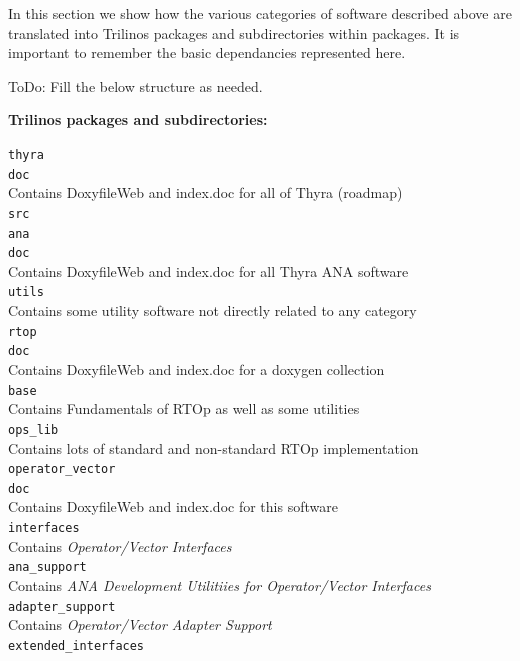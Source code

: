 \documentclass[pdf,ps2pdf,11pt]{SANDreport}
\begin{document}
In this section we show how the various categories of software described above
are translated into Trilinos packages and subdirectories within packages.  It
is important to remember the basic dependancies represented here.

ToDo: Fill the below structure as needed.

\noindent{}\textbf{Trilinos packages and subdirectories:}
%

\bifthen
\>\texttt{thyra} \\
\>\>\texttt{doc}\\
\>\>\>Contains DoxyfileWeb and index.doc for all of Thyra (roadmap) \\
\>\>\texttt{src} \\
\>\>\>\texttt{ana} \\
\>\>\>\>\texttt{doc}\\
\>\>\>\>\>Contains DoxyfileWeb and index.doc for all Thyra ANA software \\
\>\>\>\>\texttt{utils}\\
\>\>\>\>\>Contains some utility software not directly related to any category \\
\>\>\>\>\texttt{rtop}\\
\>\>\>\>\>\texttt{doc}\\
\>\>\>\>\>\>Contains DoxyfileWeb and index.doc for a doxygen collection \\
\>\>\>\>\>\texttt{base}\\
\>\>\>\>\>\>Contains Fundamentals of RTOp as well as some utilities \\
\>\>\>\>\>\texttt{ops\_lib}\\
\>\>\>\>\>\>Contains lots of standard and non-standard RTOp implementation \\
\>\>\>\>\texttt{operator\_vector} \\
\>\>\>\>\>\texttt{doc}\\
\>\>\>\>\>\>Contains DoxyfileWeb and index.doc for this software \\
\>\>\>\>\>\texttt{interfaces} \\
\>\>\>\>\>\>Contains {}\textit{Operator/Vector Interfaces} \\
\>\>\>\>\>\texttt{ana\_support}\\
\>\>\>\>\>\>Contains {}\textit{ANA Development Utilitiies for Operator/Vector Interfaces} \\
\>\>\>\>\>\texttt{adapter\_support}\\
\>\>\>\>\>\>Contains {}\textit{Operator/Vector Adapter Support} \\
\>\>\>\>\>\texttt{extended\_interfaces} \\
\end{document}
